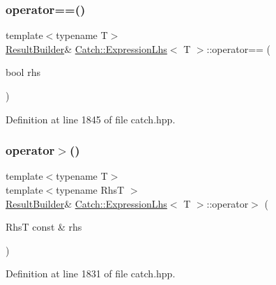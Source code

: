 \subsubsection{\texorpdfstring{operator==()}{operator==()}\hspace{0.1cm}{\footnotesize\ttfamily [2/2]}}
{\footnotesize\ttfamily template$<$typename T$>$ \\
\hyperlink{class_catch_1_1_result_builder}{Result\+Builder}\& \hyperlink{class_catch_1_1_expression_lhs}{Catch\+::\+Expression\+Lhs}$<$ T $>$\+::operator== (\begin{DoxyParamCaption}\item[{bool}]{rhs }\end{DoxyParamCaption})\hspace{0.3cm}{\ttfamily [inline]}}



Definition at line 1845 of file catch.\+hpp.

\hypertarget{class_catch_1_1_expression_lhs_ad3602a7ad945c751004065b1007dc183}{}\label{class_catch_1_1_expression_lhs_ad3602a7ad945c751004065b1007dc183} 
\subsubsection{\texorpdfstring{operator$>$()}{operator>()}}
{\footnotesize\ttfamily template$<$typename T$>$ \\
template$<$typename RhsT $>$ \\
\hyperlink{class_catch_1_1_result_builder}{Result\+Builder}\& \hyperlink{class_catch_1_1_expression_lhs}{Catch\+::\+Expression\+Lhs}$<$ T $>$\+::operator$>$ (\begin{DoxyParamCaption}\item[{RhsT const \&}]{rhs }\end{DoxyParamCaption})\hspace{0.3cm}{\ttfamily [inline]}}



Definition at line 1831 of file catch.\+hpp.

\hypertarget{class_catch_1_1_expression_lhs_a21d30d6026ff2b1f86ddbd6b0a90d036}{}\label{class_catch_1_1_expression_lhs_a21d30d6026ff2b1f86ddbd6b0a90d036} 
